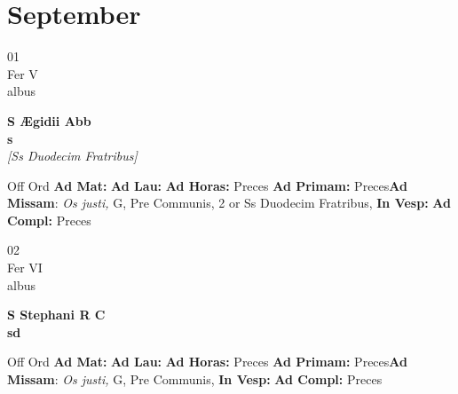\documentclass[10pt, openany]{book}
\begin{document}
    \chapter{September}
                    
    \begin{center}
        \begin{minipage}{3.5in}
            \vspace{2em}
            \begin{minipage}{0.5in}
                {\Huge 01} \\
                {\normalsize Fer V} \\
                {\normalsize albus}
            \end{minipage}
            \begin{minipage}{3.0in}
                \textbf{ \large S Ægidii Abb \\
                \textnormal{\normalsize s}} \\ \textit{[Ss Duodecim Fratribus]} \\ 
            \end{minipage}
            \begin{justify}Off Ord
                \textbf{Ad Mat: }
                \textbf{Ad Lau: }
                \textbf{Ad Horas: }Preces
                \textbf{Ad Primam: }Preces\textbf{Ad Missam}: \textit{Os justi,} G, Pre Communis, 2 or Ss Duodecim Fratribus,  
                \textbf{In Vesp: }
                \textbf{Ad Compl: }Preces
            \end{justify}
        \end{minipage}
    \end{center}

    \begin{center}
        \begin{minipage}{3.5in}
            \vspace{2em}
            \begin{minipage}{0.5in}
                {\Huge 02} \\
                {\normalsize Fer VI} \\
                {\normalsize albus}
            \end{minipage}
            \begin{minipage}{3.0in}
                \textbf{ \large S Stephani R C \\
                \textnormal{\normalsize sd}} \\ 
            \end{minipage}
            \begin{justify}Off Ord
                \textbf{Ad Mat: }
                \textbf{Ad Lau: }
                \textbf{Ad Horas: }Preces
                \textbf{Ad Primam: }Preces\textbf{Ad Missam}: \textit{Os justi,} G, Pre Communis,  
                \textbf{In Vesp: }
                \textbf{Ad Compl: }Preces
            \end{justify}
        \end{minipage}
    \end{center}
\end{document}

